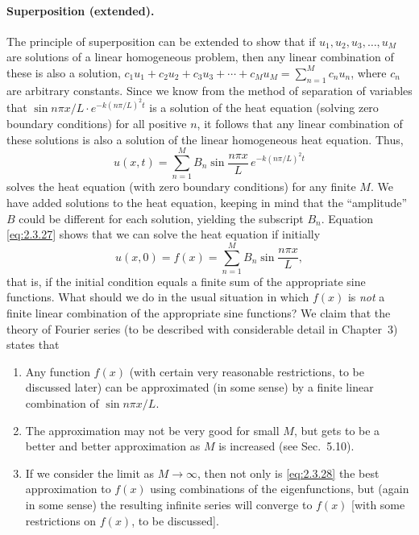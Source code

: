 \paragraph{Superposition (extended).}
The principle of superposition can be extended to show that if $u_1, u_2, u_3, \ldots, u_M$ are solutions of a linear homogeneous problem, then any linear combination of these is also a solution, $c_1 u_1 + c_2 u_2 + c_3 u_3 + \cdots + c_M u_M = \sum_{n=1}^M c_n u_n$, where $c_n$ are arbitrary constants. Since we know from the method of separation of variables that $\sin n\pi x/L \cdot e^{-k(n\pi/L)^2 t}$ is a solution of the heat equation (solving zero boundary conditions) for all positive $n$, it follows that any linear combination of these solutions is also a solution of the linear homogeneous heat equation. Thus,
\begin{equation}
\label{eq:2.3.27}
u(x,t) = \sum_{n=1}^{M} B_n \sin\frac{n\pi x}{L}\,e^{-k(n\pi/L)^2 t}
\end{equation}
solves the heat equation (with zero boundary conditions) for any finite $M$. We have added solutions to the heat equation, keeping in mind that the ``amplitude'' $B$ could be different for each solution, yielding the subscript $B_n$. Equation \eqref{eq:2.3.27} shows that we can solve the heat equation if initially
\begin{equation}
\label{eq:2.3.28}
u(x,0) = f(x) = \sum_{n=1}^{M} B_n \sin\frac{n\pi x}{L},
\end{equation}
that is, if the initial condition equals a finite sum of the appropriate sine functions. What should we do in the usual situation in which $f(x)$ is \emph{not} a finite linear combination of the appropriate sine functions? We claim that the theory of Fourier series (to be described with considerable detail in Chapter~3) states that
\begin{enumerate}
\item Any function $f(x)$ (with certain very reasonable restrictions, to be discussed later) can be approximated (in some sense) by a finite linear combination of $\sin n\pi x/L$.
\item The approximation may not be very good for small $M$, but gets to be a better and better approximation as $M$ is increased (see Sec.~5.10).
\item If we consider the limit as $M \to \infty$, then not only is \eqref{eq:2.3.28} the best approximation to $f(x)$ using combinations of the eigenfunctions, but (again in some sense) the resulting infinite series will converge to $f(x)$ [with some restrictions on $f(x)$, to be discussed].
\end{enumerate}
